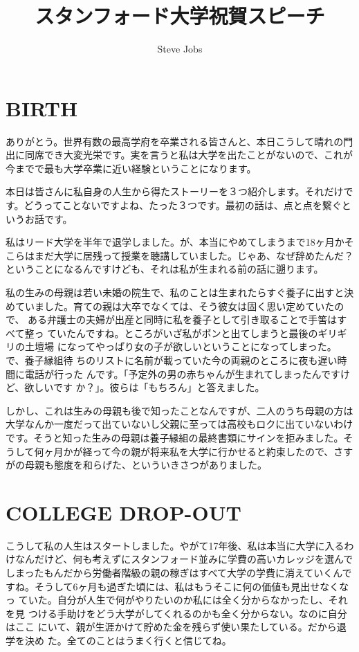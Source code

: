 \documentclass[a4paper,11pt,twocolumn]{jarticle}
\title{スタンフォード大学祝賀スピーチ}
\author{Steve Jobs}
\date{}
\begin{document}
\begin{titlepage}
\maketitle
\thispagestyle{empty}
\end{titlepage}

\section{BIRTH}

ありがとう。世界有数の最高学府を卒業される皆さんと、本日こうして晴れの門
出に同席でき大変光栄です。実を言うと私は大学を出たことがないので、これが
今までで最も大学卒業に近い経験ということになります。

本日は皆さんに私自身の人生から得たストーリーを３つ紹介します。それだけで
す。どうってことないですよね、たった３つです。最初の話は、点と点を繋ぐと
いうお話です。

私はリード大学を半年で退学しました。が、本当にやめてしまうまで18ヶ月かそ
こらはまだ大学に居残って授業を聴講していました。じゃあ、なぜ辞めたんだ？
ということになるんですけども、それは私が生まれる前の話に遡ります。

私の生みの母親は若い未婚の院生で、私のことは生まれたらすぐ養子に出すと決
めていました。育ての親は大卒でなくては、そう彼女は固く思い定めていたので、
ある弁護士の夫婦が出産と同時に私を養子として引き取ることで手筈はすべて整っ
ていたんですね。ところがいざ私がポンと出てしまうと最後のギリギリの土壇場
になってやっぱり女の子が欲しいということになってしまった。で、養子縁組待
ちのリストに名前が載っていた今の両親のところに夜も遅い時間に電話が行った
んです。「予定外の男の赤ちゃんが生まれてしまったんですけど、欲しいです
か？」。彼らは「もちろん」と答えました。

しかし、これは生みの母親も後で知ったことなんですが、二人のうち母親の方は
大学なんか一度だって出ていないし父親に至っては高校もロクに出ていないわけ
です。そうと知った生みの母親は養子縁組の最終書類にサインを拒みました。そ
うして何ヶ月かが経って今の親が将来私を大学に行かせると約束したので、さす
がの母親も態度を和らげた、といういきさつがありました。

\section{COLLEGE DROP-OUT}

こうして私の人生はスタートしました。やがて17年後、私は本当に大学に入るわ
けなんだけど、何も考えずにスタンフォード並みに学費の高いカレッジを選んで
しまったもんだから労働者階級の親の稼ぎはすべて大学の学費に消えていくんで
すね。そうして6ヶ月も過ぎた頃には、私はもうそこに何の価値も見出せなくなっ
ていた。自分が人生で何がやりたいのか私には全く分からなかったし、それを見
つける手助けをどう大学がしてくれるのかも全く分からない。なのに自分はここ
にいて、親が生涯かけて貯めた金を残らず使い果たしている。だから退学を決め
た。全てのことはうまく行くと信じてね。
\end{document}
